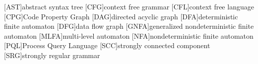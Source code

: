  
\begin{acronym}
	[AST]{abstract syntax tree}
	[CFG]{context free grammar}
	[CFL]{context free language}
	[CPG]{Code Property Graph}
	[DAG]{directed acyclic graph}
	[DFA]{deterministic finite automaton}
	[DFG]{data flow graph}
	[GNFA]{generalized nondeterministic finite automaton}
	[MLFA]{multi-level automaton}
	[NFA]{nondeterministic finite automaton}
	[PQL]{Process Query Language}
	[SCC]{strongly connected component}
	[SRG]{strongly regular grammar}
\end{acronym}